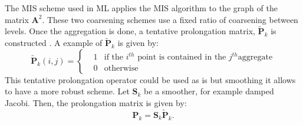 \documentclass[preprint,10pt]{elsarticle}
\newcommand\bs{\boldsymbol}
\renewcommand{\(}{\left(}
\renewcommand{\)}{\right)}
\renewcommand{\[}{\left[}
\renewcommand{\]}{\right]}
\begin{document}
The MIS scheme used in ML applies the MIS algorithm \cite{graph_coloring} to
the graph of the matrix $\bs{A}^2$. These two coarsening 
schemes use a fixed ratio of coarsening between levels. 
%
Once the aggregation is done, a tentative prolongation matrix, $\bs{\tilde{P}}_k$ 
is constructed \cite{mis}. A example of $\bs{\tilde{P}}_k$ is given by:
\begin{equation}
  \bs{\tilde{P}}_k(i,j) = \left\{
  \begin{aligned}
    &1 &\textrm{if the }i^{th}\textrm{ point is contained in the }j^{th}\textrm{
    aggregate}\\
    & 0 &\textrm{otherwise}
  \end{aligned}
  \right.
\end{equation}
This tentative prolongation operator could be used as is but smoothing it
allows to have a more robust scheme. Let $\bs{S}_k$ be a smoother, for example
damped Jacobi. Then, the prolongation matrix is given by:
\begin{equation}
  \bs{P}_k = \bs{S}_k \bs{\tilde{P}}_k.
\end{equation}

\end{document}
